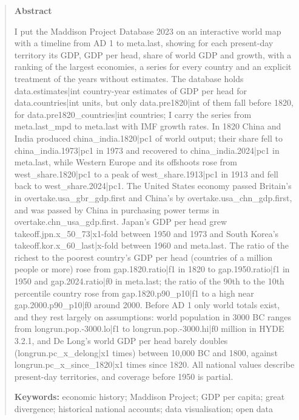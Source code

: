 \documentclass[11pt,a4paper]{article}
\begin{document}
\begin{quote}
\small
\begin{center}\textbf{Abstract}\end{center}
I put the Maddison Project Database 2023 \citep{mpd2023} on an interactive world map with a timeline from AD 1 to {{meta.last}}, showing for each present-day territory its GDP, GDP per head, share of world GDP and growth, with a ranking of the largest economies, a series for every country and an explicit treatment of the years without estimates. The database holds {{data.estimates|int}} country-year estimates of GDP per head for {{data.countries|int}} units, but only {{data.pre1820|int}} of them fall before 1820, for {{data.pre1820_countries|int}} countries; I carry the series from {{meta.last_mpd}} to {{meta.last}} with IMF growth rates. In 1820 China and India produced {{china_india.1820|pc1}} of world output; their share fell to {{china_india.1973|pc1}} in 1973 and recovered to {{china_india.2024|pc1}} in {{meta.last}}, while Western Europe and its offshoots rose from {{west_share.1820|pc1}} to a peak of {{west_share.1913|pc1}} in 1913 and fell back to {{west_share.2024|pc1}}. The United States economy passed Britain's in {{overtake.usa_gbr_gdp.first}} and China's by {{overtake.usa_chn_gdp.first}}, and was passed by China in purchasing power terms in {{overtake.chn_usa_gdp.first}}. Japan's GDP per head grew {{takeoff.jpn.x_50_73|x1}}-fold between 1950 and 1973 and South Korea's {{takeoff.kor.x_60_last|x}}-fold between 1960 and {{meta.last}}. The ratio of the richest to the poorest country's GDP per head (countries of a million people or more) rose from {{gap.1820.ratio|f1}} in 1820 to {{gap.1950.ratio|f1}} in 1950 and {{gap.2024.ratio|f0}} in {{meta.last}}; the ratio of the 90th to the 10th percentile country rose from {{gap.1820.p90_p10|f1}} to a high near {{gap.2000.p90_p10|f0}} around 2000. Before AD 1 only world totals exist, and they rest largely on assumptions: world population in 3000 BC ranges from {{longrun.pop.-3000.lo|f1}} to {{longrun.pop.-3000.hi|f0}} million in HYDE 3.2.1, and De Long's world GDP per head barely doubles ({{longrun.pc_x_delong|x1}} times) between 10,000 BC and 1800, against {{longrun.pc_x_since_1820|x1}} times since 1820. All national values describe present-day territories, and coverage before 1950 is partial.

\textbf{Keywords:} economic history; Maddison Project; GDP per capita; great divergence; historical national accounts; data visualisation; open data
\end{quote}
\end{document}
